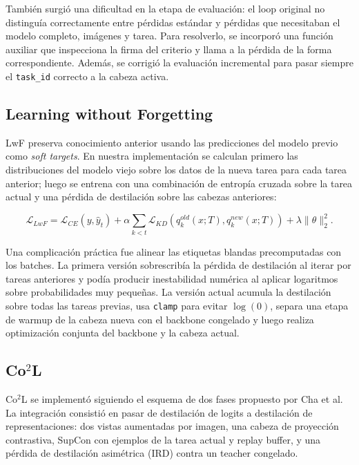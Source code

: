 \documentclass[10pt,a4paper]{article}
\begin{document}
También surgió una dificultad en la etapa de evaluación: el loop original no distinguía correctamente entre pérdidas estándar y pérdidas que necesitaban el modelo completo, imágenes y tarea. Para resolverlo, se incorporó una función auxiliar que inspecciona la firma del criterio y llama a la pérdida de la forma correspondiente. Además, se corrigió la evaluación incremental para pasar siempre el \texttt{task\_id} correcto a la cabeza activa.

\subsection{Learning without Forgetting}

LwF preserva conocimiento anterior usando las predicciones del modelo previo como \textit{soft targets}. En nuestra implementación se calculan primero las distribuciones del modelo viejo sobre los datos de la nueva tarea para cada tarea anterior; luego se entrena con una combinación de entropía cruzada sobre la tarea actual y una pérdida de destilación sobre las cabezas anteriores:

\begin{equation}
\mathcal{L}_{LwF} =
\mathcal{L}_{CE}(y, \hat{y}_t)
+ \alpha
\sum_{k<t}
\mathcal{L}_{KD}
\left(
q_k^{old}(x; T),
q_k^{new}(x; T)
\right)
+ \lambda \|\theta\|_2^2.
\end{equation}

Una complicación práctica fue alinear las etiquetas blandas precomputadas con los batches. La primera versión sobrescribía la pérdida de destilación al iterar por tareas anteriores y podía producir inestabilidad numérica al aplicar logaritmos sobre probabilidades muy pequeñas. La versión actual acumula la destilación sobre todas las tareas previas, usa \texttt{clamp} para evitar \(\log(0)\), separa una etapa de warmup de la cabeza nueva con el backbone congelado y luego realiza optimización conjunta del backbone y la cabeza actual.

\subsection{Co$^2$L}

Co$^2$L se implementó siguiendo el esquema de dos fases propuesto por Cha et al. La integración consistió en pasar de destilación de logits a destilación de representaciones: dos vistas aumentadas por imagen, una cabeza de proyección contrastiva, SupCon con ejemplos de la tarea actual y replay buffer, y una pérdida de destilación asimétrica (IRD) contra un teacher congelado. 
\end{document}
